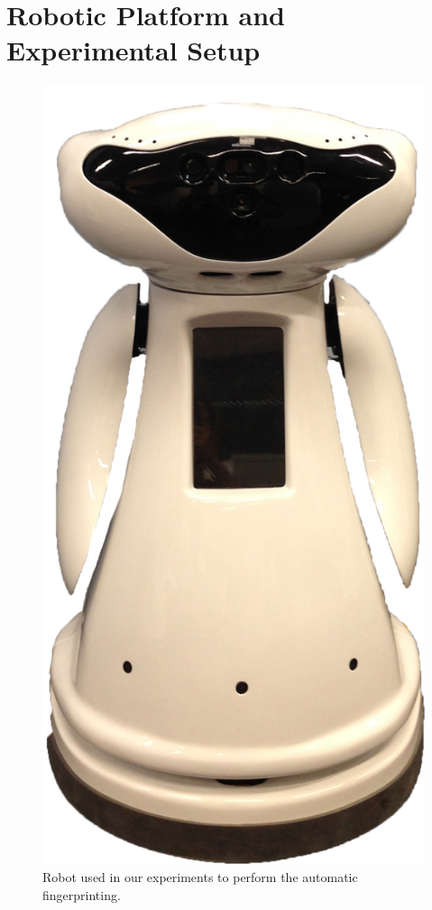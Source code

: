 \section{ Robotic Platform and Experimental Setup}
\label{sec:experimental_setup}



\begin{figure}
    \centering
    \includegraphics[scale=0.07]{pictures/robot.jpg}
    \caption{Robot used in our experiments to perform the automatic fingerprinting.}
     \label{robot}
\end{figure}


